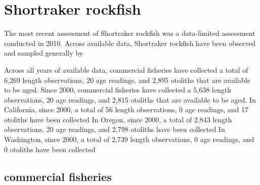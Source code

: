 \documentclass[11pt,
  english,
  letterpaper,
]{article}
\begin{document}

\hypertarget{shortraker-rockfish}{%
\section{Shortraker rockfish}\label{shortraker-rockfish}}

\leavevmode\tagmcend\tagstructend


The most recent assessment of Shortraker rockfish was a data-limited assessment conducted in 2010. Across available data, Shortraker rockfish have been observed and sampled generally by

\leavevmode\tagmcend\tagstructend\par


Across all years of available data, commercial fisheries have collected a total of 6,269 length observations, 20 age readings, and 2,895 otoliths that are available to be aged. Since 2000, commercial fisheries have collected a 5,638 length observations, 20 age readings, and 2,815 otoliths that are available to be aged. In California, since 2000, a total of 56 length observations, 0 age readings, and 17 otoliths have been collected In Oregon, since 2000, a total of 2,843 length observations, 20 age readings, and 2,798 otoliths have been collected In Washington, since 2000, a total of 2,739 length observations, 0 age readings, and 0 otoliths have been collected

\leavevmode\tagmcend\tagstructend\par


\hypertarget{commercial-fisheries-47}{%
\subsection{commercial fisheries}\label{commercial-fisheries-47}}

\leavevmode\tagmcend\tagstructend


\begingroup\fontsize{10}{12}\selectfont \begingroup\fontsize{10}{12}\selectfont

\leavevmode\tagmcend\tagstructend\par
\end{document}
